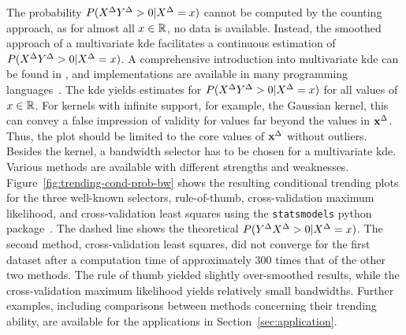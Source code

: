 The probability $P(X^{\Delta} Y^{\Delta} > 0 | X^{\Delta} = x)$ cannot be computed by the counting approach, as for almost all $x \in \mathbb{R}$, no data is available.
Instead, the smoothed approach of a multivariate \acf{kde} facilitates a continuous estimation of $P(X^{\Delta} Y^{\Delta} > 0 | X^{\Delta} = x)$.
A comprehensive introduction into multivariate \ac{kde} can be found in \textcite{Gramacki2018}, and implementations are available in many programming languages~\parencite[e.g., for  Python in][]{Seabold2010}.
The \ac{kde} yields estimates for $P(X^{\Delta} Y^{\Delta} > 0 | X^{\Delta} = x)$ for all values of $x \in \mathbb{R}$.
For kernels with infinite support, for example, the Gaussian kernel, this can convey a false impression of validity for values far beyond the values in $\mathbf{x}^{\Delta}$.
Thus, the plot should be limited to the core values of $\mathbf{x}^{\Delta}$ without outliers.
Besides the kernel, a bandwidth selector has to be chosen for a multivariate \ac{kde}.
Various methods are available with different strengths and weaknesses.
Figure~\ref{fig:trending-cond-prob-bw} shows the resulting conditional trending plots for the three well-known selectors, rule-of-thumb, cross-validation maximum likelihood, and cross-validation least squares using the \verb|statsmodels| python package~\parencite{Seabold2010}.
The dashed line shows the theoretical $P(Y^{\Delta} X^{\Delta} > 0 | X^{\Delta} = x)$.
The second method, cross-validation least squares, did not converge for the first dataset after a computation time of approximately 300 times that of the other two methods.
The rule of thumb yielded slightly over-smoothed results, while the cross-validation maximum likelihood yields relatively small bandwidths.
Further examples, including comparisons between methods concerning their trending ability, are available for the applications in Section~\ref{sec:application}.

